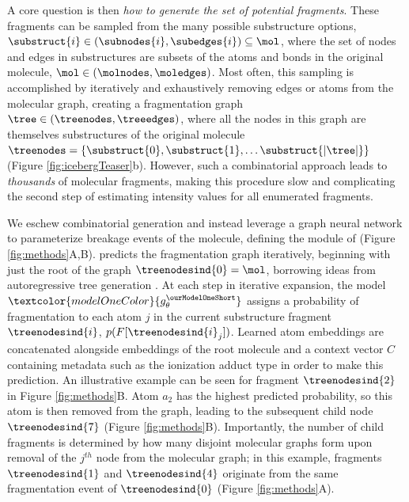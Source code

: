 \documentclass[journal=jcim,manuscript=article]{achemso}
\begin{document}
A core question is then \emph{how to generate the set of potential fragments}. These fragments can be sampled from the many possible substructure options, $\substruct{i} \in (\subnodes{i}, \subedges{i}) \subseteq \mol$, where the set of nodes and edges in substructures are subsets of the atoms and bonds in the original molecule, $\mol \in (\molnodes, \moledges)$. Most often, this sampling is accomplished by iteratively and exhaustively removing edges or atoms from the molecular graph, creating a fragmentation graph $\tree \in (\treenodes, \treeedges)$, where all the nodes in this graph are themselves substructures of the original molecule $\treenodes = \{\substruct{0}, \substruct{1}, \dots \substruct{|\tree|}\}$~\cite{allen_competitive_2015, wolf_silico_2010,  ridder_automatic_2014} (Figure \ref{fig:icebergTeaser}b). However, such a combinatorial approach leads to \emph{thousands} of molecular fragments, making this procedure slow and complicating the second step of estimating intensity values for all enumerated fragments.

We eschew combinatorial generation and instead leverage a graph neural network to parameterize breakage events of the molecule, defining the \ourModelOneShort module of \ourModel (Figure \ref{fig:methods}A,B).  \ourModelOneShort predicts the fragmentation graph iteratively, beginning with just the root of the graph $\treenodesind{0} = \mol$, borrowing ideas from autoregressive tree generation \cite{bradshaw_barking_2020, gao_amortized_2021}. At each step in iterative expansion, the model  $\textcolor{modelOneColor}{g_{\theta}^{\ourModelOneShort}}$ assigns a probability of fragmentation to each atom $j$ in the current substructure fragment $\treenodesind{i}$, $p(F[\treenodesind{i}_j])$. %
Learned atom embeddings are concatenated alongside embeddings of the root molecule and a context vector $C$ containing metadata such as the ionization adduct type in order to make this prediction. %
An illustrative example can be seen for fragment $\treenodesind{2}$  in Figure \ref{fig:methods}B. 
Atom $a_2$ has the highest predicted probability, so this atom is then removed from the graph, leading to the subsequent child node $\treenodesind{7}$ (Figure \ref{fig:methods}B). Importantly, the number of child fragments is determined by how many disjoint molecular graphs form upon removal of the $j^{th}$ node from the molecular graph; in this example, fragments $\treenodesind{1}$ and  $\treenodesind{4}$ originate from the same fragmentation event of $\treenodesind{0}$ (Figure \ref{fig:methods}A). 
\end{document}
